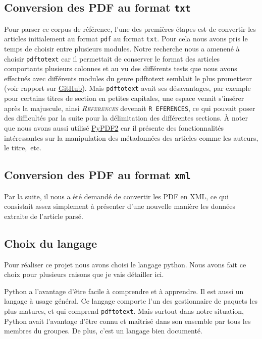 \documentclass{article}
\begin{document}
\subsection{Conversion des PDF au format \texttt{txt}}
Pour parser ce corpus de référence, l'une des premières étapes est de convertir les articles initialement au format \texttt{pdf} au format \texttt{txt}. Pour cela nous avons pris le temps de choisir entre plusieurs modules. Notre recherche nous a amenené à choisir \texttt{pdftotext} car il permettait de conserver le format des articles comportants plusieurs colonnes et au vu des différents tests que nous avons effectués avec différents modules du genre pdftotext semblait le plus prometteur (voir rapport sur \textcolor{blue}{\href{https://github.com/TheauH/Parser-IRISA/tree/conversionpdf}{GitHub}}). Mais \texttt{pdftotext} avait ses désavantages, par exemple pour certains titres de section en petites capitales, une espace venait s’insérer après la majuscule, ainsi \textit{\textsc{References}} devenait \texttt{R EFERENCES}, ce qui pouvait poser des difficultés par la suite pour la délimitation des différentes sections. À noter que nous avons aussi utilisé \textcolor{blue}{\href{https://pypi.org/project/PyPDF2/}{PyPDF2}} car il présente des fonctionnalités intéressantes sur la manipulation des métadonnées des articles comme les auteurs, le titre,~etc.

\subsection{Conversion des PDF au format \texttt{xml}}
Par la suite, il nous a été demandé de convertir les PDF en XML, ce qui consistait assez simplement à présenter d'une nouvelle manière les données extraite de l'article parsé.

\subsection{Choix du langage}
Pour réaliser ce projet nous avons choisi le langage python. Nous avons fait ce choix pour plusieurs raisons que je vais détailler ici.

Python a l'avantage d'être facile à comprendre et à apprendre. Il est aussi un langage à usage général. Ce langage comporte l'un des gestionnaire de paquets les plus matures, et qui comprend \texttt{pdftotext}. Mais surtout dans notre situation, Python avait l'avantage d'être connu et maîtrisé dans son ensemble par tous les membres du groupes. De plus, c'est un langage bien documenté.
\end{document}
